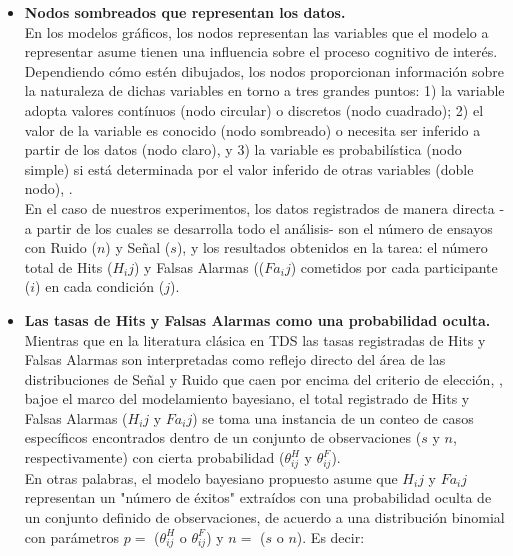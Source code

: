 \begin{itemize}
\item \textbf{Nodos sombreados que representan los datos.}\\

En los modelos gráficos, los nodos representan las variables que el modelo a representar asume tienen una influencia sobre el proceso cognitivo de interés. Dependiendo cómo estén dibujados, los nodos proporcionan información sobre la naturaleza de dichas variables en torno a tres grandes puntos: 1) la variable adopta valores contínuos (nodo circular) o discretos (nodo cuadrado); 2) el valor de la variable es conocido (nodo sombreado) o necesita ser inferido a partir de los datos (nodo claro), y 3) la variable es probabilística (nodo simple) si está determinada por el valor inferido de otras variables (doble nodo), \parencite{LeeBook}.\\

En el caso de nuestros experimentos, los datos registrados de manera directa -a partir de los cuales se desarrolla todo el análisis- son el número de ensayos con Ruido ($n$) y Señal ($s$), y los resultados obtenidos en la tarea: el número total de Hits ($H_ij$) y Falsas Alarmas (($Fa_ij$) cometidos por cada participante ($i$) en cada condición ($j$).\\

\item \textbf{Las tasas de Hits y Falsas Alarmas como una probabilidad oculta.}\\ 

Mientras que en la literatura clásica en TDS las tasas registradas de Hits y Falsas Alarmas son interpretadas como reflejo directo del área de las distribuciones de Señal y Ruido que caen por encima del criterio de elección, \parencite{Wickens, Gescheider, Stainslaw1999}, bajoe el marco del modelamiento bayesiano, el total registrado de Hits y Falsas Alarmas ($H_ij$ y $Fa_ij$) se toma una instancia de un conteo de casos específicos encontrados dentro de un conjunto de observaciones ($s$ y $n$, respectivamente) con cierta probabilidad ($\theta^H_{ij}$ y $\theta^F_{ij}$).\\

En otras palabras, el modelo bayesiano propuesto asume que $H_ij$ y $Fa_ij$ representan un "número de éxitos" extraídos con una probabilidad oculta de un conjunto definido de observaciones, de acuerdo a una distribución binomial con parámetros $p=$ ($\theta^H_{ij}$ o $\theta^F_{ij}$) y $n=$ ($s$ o $n$). Es decir:\\


\end{itemize}

